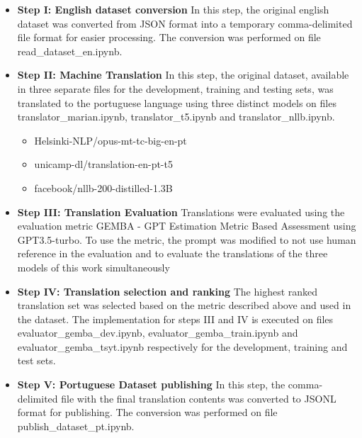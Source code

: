 \documentclass{article}
\begin{document}
\begin{itemize}
    \item \textbf{Step I: English dataset conversion} In this step, the original
    english dataset was converted from JSON format into a temporary 
    comma-delimited file format for easier processing. The conversion was
    performed on file read\_dataset\_en.ipynb.
    \item \textbf{Step II: Machine Translation} In this step, the original
    dataset, available in three separate files for the development, training and
    testing sets, was translated to the portuguese language using three distinct
    models on files translator\_marian.ipynb, translator\_t5.ipynb and translator\_nllb.ipynb.
        \begin{itemize}
            \item Helsinki-NLP/opus-mt-tc-big-en-pt
            \item unicamp-dl/translation-en-pt-t5
            \item facebook/nllb-200-distilled-1.3B
        \end{itemize}
    \item \textbf{Step III: Translation Evaluation} Translations were evaluated
    using the evaluation metric GEMBA - GPT Estimation Metric Based Assessment
    \cite{kocmi2023large} using GPT3.5-turbo. To use the metric, the prompt was
    modified to not use human reference in the evaluation and to evaluate the
    translations of the three models of this work simultaneously 
    \item \textbf{Step IV: Translation selection and ranking} The highest ranked translation set
    was selected based on the metric described above and used in the dataset.
    The implementation for steps III and IV is executed on files
    evaluator\_gemba\_dev.ipynb, evaluator\_gemba\_train.ipynb and
    evaluator\_gemba\_tsyt.ipynb respectively for the development, training and
    test sets.
    \item \textbf{Step V: Portuguese Dataset publishing}  In this step, the
    comma-delimited file with the final translation contents was converted to
    JSONL format for publishing. The conversion was performed on file 
    publish\_dataset\_pt.ipynb.
\end{itemize}
 
\end{document}
